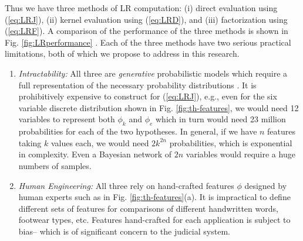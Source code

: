 \documentclass[11pt, doublespacing]{article}
\begin{document}
Thus we have three methods of LR computation: (i)  direct evaluation using (\ref{eq:LRJ}), (ii) kernel evaluation using (\ref{eq:LRD}), and (iii) factorization using (\ref{eq:LRF}).
A comparison of the performance of the three methods is shown in Fig. \ref{fig:LRperformance} \cite{Tang-Srihari14}. Each of the three methods  have two serious practical limitations, both of which we propose to address in this research. 
\begin{enumerate}
\item {\em Intractability:} All three are {\em generative}  probabilistic models which  require a full representation of the necessary probability distributions \cite{Bishop2006}. It is prohibitively expensive to construct for (\ref{eq:LRJ}), e.g., even  for the six variable discrete distribution  shown in Fig. \ref{fig:th-features},  we would need 12 variables to represent both $\phi _k$ and $\phi _ e$ which in turn would need 23 million probabilities for each of the two hypotheses. In general, if we have $n$ features taking $k$ values each, we would need $2k^{2n}$ probabilities, which is exponential in complexity. Even a Bayesian network of $2n$ variables would require a huge numbers of samples.
\item {\em Human Engineering:} All three rely on  hand-crafted features $\phi$ designed by human experts  such as in Fig. \ref{fig:th-features}(a). It is impractical to define different sets of features for comparisons of different handwritten words, footwear types, etc. Features hand-crafted for each application is subject to bias-- which is of significant concern to the judicial system.
\end{enumerate}
\end{document}
